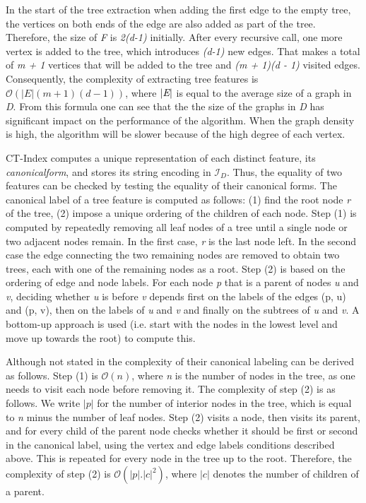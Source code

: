 \documentclass{l4proj}
\newcommand{\fancyI}{\mathcal{I}}
\begin{document}
In the start of the \gls{tree} extraction when adding the first edge to the empty tree, the vertices on both ends of the edge are also added as part of the tree. Therefore, the size of \emph{F} is \emph{2(d-1)} initially. After every recursive call, one more vertex is added to the tree, which introduces \emph{(d-1)} new edges. That makes a total of \emph{m + 1} vertices that will be added to the tree and \emph{(m + 1)(d - 1)} visited edges. Consequently, the complexity of extracting tree features is $\mathcal{O}(|E|(m + 1)(d - 1))$, where $|\emph{E}|$ is equal to the average size of a graph in \emph{D}. From this formula one can see that the the size of the graphs in \emph{D} has significant impact on the performance of the algorithm. When the graph density is high, the algorithm will be slower because of the high degree of each vertex.

CT-Index computes a unique representation of each distinct feature, its \emph{\gls{canonicalform}}, and stores its string encoding in $\fancyI_{D}$. Thus, the equality of two features can be checked by testing the equality of their canonical forms. The canonical label of a \gls{tree} feature is computed as follows: (1) find the root node \emph{r} of the tree, (2) impose a unique ordering of the children of each node. Step (1) is computed by repeatedly removing all leaf nodes of a \gls{tree} until a single node or two adjacent nodes remain. In the first case, \emph{r} is the last node left. In the second case the edge connecting the two remaining nodes are removed to obtain two \glspl{tree}, each with one of the remaining nodes as a root.
Step (2) is based on the ordering of edge and node labels. For each node \textit{p} that is a parent of nodes \textit{u} and \textit{v}, deciding whether \textit{u} is before \textit{v} depends first on the labels of the edges (p, u) and (p, v), then on the labels of \textit{u} and \textit{v} and finally on the subtrees of \textit{u} and \textit{v}. A bottom-up approach is used (i.e. start with the nodes in the lowest level and move up towards the root) to compute this.

Although not stated in \cite{ctindex} the complexity of their canonical labeling can be derived as follows. Step (1) is $\mathcal{O}(n)$, where \emph{n} is the number of nodes in the tree, as one needs to visit each node before removing it. The complexity of step (2) is as follows. We write $|p|$ for the number of interior nodes in the tree, which is equal to \emph{n} minus the number of leaf nodes. Step (2) visits a node, then visits its parent, and for every child of the parent node checks whether it should be first or second in the canonical label, using the vertex and edge labels conditions described above. This is repeated for every node in the tree up to the root. Therefore, the complexity of step (2) is $\mathcal{O}(|p|.|c|^{2})$, where $|c|$ denotes the number of children of a parent.
\end{document}
